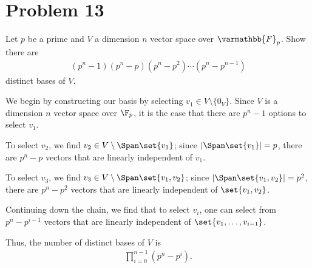 \documentclass[10pt]{mypackage}
\renewcommand*{\mathbb}[1]{\varmathbb{#1}}
\begin{document}
\section{Problem 13}%
\begin{problem}
  Let $p$ be a prime and $V$ a dimension $n$ vector space over $\mathbb{F}_p$. Show there are
  \begin{align*}
    \left(p^n-1\right)\left(p^n - p\right)\left(p^n - p^2\right)\cdots \left(p^n - p^{n-1}\right)
  \end{align*}
  distinct bases of $V$.
\end{problem}
\begin{solution}
  We begin by constructing our basis by selecting $v_1 \in V\setminus \{0_V\}$. Since $V$ is a dimension $n$ vector space over $\F_p$, it is the case that there are $p^n - 1$ options to select $v_1$.\newline

  To select $v_2$, we find $v_2\in V\setminus \Span\set{v_1}$; since $|\Span\set{v_1}| = p$, there are $p^n - p$ vectors that are linearly independent of $v_1$.\newline

  To select $v_3$, we find $v_3 \in V\setminus \Span\set{v_1,v_2}$; since $\left\vert \Span\set{v_1,v_2} \right\vert = p^2$, there are $p^n - p^2$ vectors that are linearly independent of $\set{v_1,v_2}$.\newline

  Continuing down the chain, we find that to select $v_i$, one can select from $p^n - p^{i-1}$ vectors that are linearly independent of $\set{v_1,\dots,v_{i-1}}$.\newline

  Thus, the number of distinct bases of $V$ is
  \begin{align*}
    \prod_{i=0}^{n-1}\left(p^n - p^{i}\right).
  \end{align*}
\end{solution}
\end{document}

